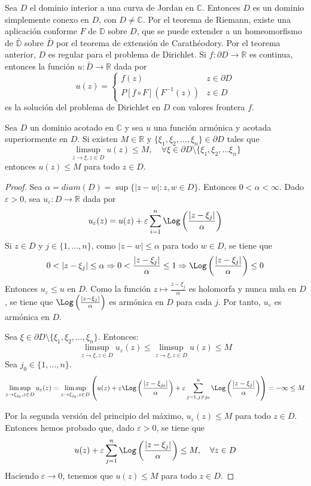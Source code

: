 Sea $D$ el dominio interior a una curva de Jordan en $\mathbb{C}$.
Entonces $D$ es un dominio simplemente conexo en $D$, con $D \neq \mathbb{C}$.
Por el teorema de Riemann, existe una aplicación conforme $F$ de $\mathbb{D}$ sobre $D$, que se puede extender a un homeomorfismo de $\bar{\mathbb{D}}$ sobre $\bar{D}$ por el teorema de extensión de Carathéodory.
Por el teorema anterior, $D$ es regular para el problema de Dirichlet.
Si $f: \partial D \to \mathbb{R}$ es continua, entonces la función $u: \bar{D} \to \mathbb{R}$ dada por
$$u(z) = \begin{cases}
        f(z)                    & z \in \partial D \\
        P[f \circ F](F^{-1}(z)) & z \in D
    \end{cases}$$
es la solución del problema de Dirichlet en $D$ con valores frontera $f$.

\begin{theorem}
    Sea $D$ un dominio acotado en $\mathbb{C}$ y sea $u$ una función armónica y acotada superiormente en $D$.
    Si existen $M \in \mathbb{R}$ y $\{\xi_1, \xi_2, \dots, \xi_n\} \in \partial D$ tales que
    $$\limsup_{z \to \xi, z \in D} u(z) \leq M, \quad \forall \xi \in \partial D \setminus \{\xi_1, \xi_2, \dots \xi_n\}$$
    entonces $u(z) \leq M$ para todo $z \in D$.
\end{theorem}

\begin{proof}
    Sea $\alpha = diam(D) = \sup \{|z-w| : z, w \in D\}$.
    Entonces $0 < \alpha < \infty$.
    Dado $\varepsilon > 0$, sea $u_\varepsilon: D \to \mathbb{R}$ dada por
    $$u_\varepsilon(z) = u(z) + \varepsilon \sum_{i=1}^n \Log\left(\frac{|z-\xi_j|}{\alpha}\right)$$
    Si $z \in D$ y $j \in \{1, \dots, n\}$, como $|z-w| \leq \alpha$ para todo $w \in D$, se tiene que
    $$0 < |z-\xi_j| \leq \alpha \Rightarrow 0 < \frac{|z-\xi_j|}{\alpha} \leq 1 \Rightarrow \Log\left(\frac{|z-\xi_j|}{\alpha}\right) \leq 0$$
    Entonces $u_\varepsilon \leq u$ en $D$.
    Como la función $z \mapsto \frac{z-\xi_j}{\alpha}$ es holomorfa y nunca nula en $D$, se tiene que $\Log\left(\frac{|z-\xi_j|}{\alpha}\right)$ es armónica en $D$ para cada $j$.
    Por tanto, $u_\varepsilon$ es armónica en $D$.

    Sea $\xi \in \partial D \setminus \{\xi_1, \xi_2, \dots, \xi_n\}$.
    Entonces:
    $$\limsup_{z \to \xi, z \in D} u_\varepsilon(z) \leq \limsup_{z \to \xi, z \in D} u(z) \leq M$$
    Sea $j_0 \in \{1, \dots, n\}$.
    $$\limsup_{z \to \xi_{j_0}, z \in D} u_\varepsilon(z) = \limsup_{z \to \xi_{j_0}, z \in D} \left(u(z) + \varepsilon\Log\left(\frac{|z-\xi_{j_0}|}{\alpha}\right) + \varepsilon \sum_{j = 1, j \neq j_0}^n \Log\left(\frac{|z-\xi_j|}{\alpha}\right)\right) = -\infty \leq M$$

    Por la segunda versión del principio del máximo, $u_\varepsilon(z) \leq M$ para todo $z \in D$.
    Entonces hemos probado que, dado $\varepsilon > 0$, se tiene que
    $$u(z) + \varepsilon \sum_{j=1}^n \Log\left(\frac{|z-\xi_j|}{\alpha}\right) \leq M, \quad \forall z \in D$$
    Haciendo $\varepsilon \to 0$, tenemos que $u(z) \leq M$ para todo $z \in D$.
\end{proof}

